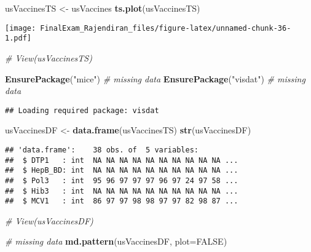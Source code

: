 \documentclass[]{article}
\newenvironment{Shaded}{\begin{snugshade}}{\end{snugshade}}
\newcommand{\CommentTok}[1]{\textcolor[rgb]{0.56,0.35,0.01}{\textit{#1}}}
\newcommand{\DataTypeTok}[1]{\textcolor[rgb]{0.13,0.29,0.53}{#1}}
\newcommand{\KeywordTok}[1]{\textcolor[rgb]{0.13,0.29,0.53}{\textbf{#1}}}
\newcommand{\NormalTok}[1]{#1}
\newcommand{\OtherTok}[1]{\textcolor[rgb]{0.56,0.35,0.01}{#1}}
\newcommand{\StringTok}[1]{\textcolor[rgb]{0.31,0.60,0.02}{#1}}
\begin{document}
\begin{Shaded}
\begin{Highlighting}[]
\NormalTok{usVaccinesTS <-}\StringTok{ }\NormalTok{usVaccines}
\KeywordTok{ts.plot}\NormalTok{(usVaccinesTS)}
\end{Highlighting}
\end{Shaded}

\texttt{[image: FinalExam\_Rajendiran\_files/figure-latex/unnamed-chunk-36-1.pdf]}

\begin{Shaded}
\begin{Highlighting}[]
\CommentTok{# View(usVaccinesTS)}
\end{Highlighting}
\end{Shaded}

\begin{Shaded}
\begin{Highlighting}[]
\KeywordTok{EnsurePackage}\NormalTok{(}\StringTok{"mice"}\NormalTok{) }\CommentTok{# missing data }
\KeywordTok{EnsurePackage}\NormalTok{(}\StringTok{"visdat"}\NormalTok{) }\CommentTok{# missing data }
\end{Highlighting}
\end{Shaded}

\begin{verbatim}
## Loading required package: visdat
\end{verbatim}

\begin{Shaded}
\begin{Highlighting}[]
\NormalTok{usVaccinesDF <-}\StringTok{ }\KeywordTok{data.frame}\NormalTok{(usVaccinesTS)}
\KeywordTok{str}\NormalTok{(usVaccinesDF)}
\end{Highlighting}
\end{Shaded}

\begin{verbatim}
## 'data.frame':    38 obs. of  5 variables:
##  $ DTP1   : int  NA NA NA NA NA NA NA NA NA NA ...
##  $ HepB_BD: int  NA NA NA NA NA NA NA NA NA NA ...
##  $ Pol3   : int  95 96 97 97 97 96 97 24 97 58 ...
##  $ Hib3   : int  NA NA NA NA NA NA NA NA NA NA ...
##  $ MCV1   : int  86 97 97 98 98 97 97 82 98 87 ...
\end{verbatim}

\begin{Shaded}
\begin{Highlighting}[]
\CommentTok{# View(usVaccinesDF)}

\CommentTok{# missing data }
\KeywordTok{md.pattern}\NormalTok{(usVaccinesDF, }\DataTypeTok{plot=}\OtherTok{FALSE}\NormalTok{)}
\end{Highlighting}
\end{Shaded}
\end{document}
